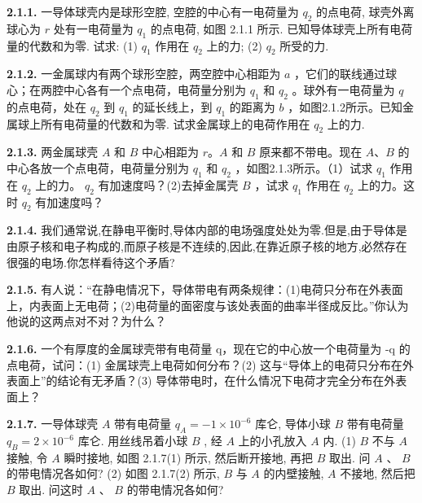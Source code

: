 \textbf{2.1.1.} 一导体球壳内是球形空腔, 空腔的中心有一电荷量为 $q_{2}$ 的点电荷, 球壳外离球心为 $r$ 处有一电荷量为 $q_{1}$ 的点电荷, 如图 2.1.1 所示. 已知导体球壳上所有电荷量的代数和为零. 试求: (1) $q_{1}$ 作用在 $q_{2}$ 上的力; (2) $q_{2}$ 所受的力.

\vfill
\newpage

\textbf{2.1.2.} 一金属球内有两个球形空腔，两空腔中心相距为 $a$ ，它们的联线通过球心；在两腔中心各有一个点电荷，电荷量分别为 $q_{1}$ 和 $q_{2}$ 。球外有一电荷量为 $q$ 的点电荷，处在 $q_{2}$ 到 $q_{1}$ 的延长线上，到 $q_{1}$ 的距离为 $b$ ，如图2.1.2所示。已知金属球上所有电荷量的代数和为零. 试求金属球上的电荷作用在 $q_{2}$ 上的力.

\begin{center}
\end{center}

\vfill
\newpage

\textbf{2.1.3.} 两金属球壳 $A$ 和 $B$ 中心相距为 $r$。$A$ 和 $B$ 原来都不带电。现在 $A$、$B$ 的中心各放一个点电荷，电荷量分别为 $q_{1}$ 和 $q_{2}$ ，如图2.1.3所示。（1）试求 $q_{1}$ 作用在 $q_{2}$ 上的力。 $q_{2}$ 有加速度吗？(2)去掉金属壳 $B$ ，试求 $q_{1}$ 作用在 $q_{2}$ 上的力。这时 $q_{2}$ 有加速度吗？

\vfill
\newpage

\textbf{2.1.4.} 我们通常说,在静电平衡时,导体内部的电场强度处处为零.但是,由于导体是由原子核和电子构成的,而原子核是不连续的,因此,在靠近原子核的地方,必然存在很强的电场.你怎样看待这个矛盾?

\vfill
\newpage

\textbf{2.1.5.} 有人说：“在静电情况下，导体带电有两条规律：(1)电荷只分布在外表面上，内表面上无电荷；(2)电荷量的面密度与该处表面的曲率半径成反比。”你认为他说的这两点对不对？为什么？

\vfill
\newpage

\textbf{2.1.6.} 一个有厚度的金属球壳带有电荷量 q，现在它的中心放一个电荷量为 -q 的点电荷，试问：(1) 金属球壳上电荷如何分布？(2) 这与“导体上的电荷只分布在外表面上”的结论有无矛盾？(3) 导体带电时，在什么情况下电荷才完全分布在外表面上？

\vfill
\newpage

\textbf{2.1.7.} 一导体球壳 $A$ 带有电荷量 $q_{A} = -1 \times 10^{-6}$ 库仑, 导体小球 $B$ 带有电荷量 $q_{B} = 2 \times 10^{-6}$ 库仑. 用丝线吊着小球 $B$ , 经 $A$ 上的小孔放入 $A$ 内. (1) $B$ 不与 $A$ 接触, 令 $A$ 瞬时接地, 如图 2.1.7(1) 所示, 然后断开接地, 再把 $B$ 取出. 问 $A$ 、 $B$ 的带电情况各如何? (2) 如图 2.1.7(2) 所示, $B$ 与 $A$ 的内壁接触, $A$ 不接地, 然后把 $B$ 取出. 问这时 $A$ 、 $B$ 的带电情况各如何?

